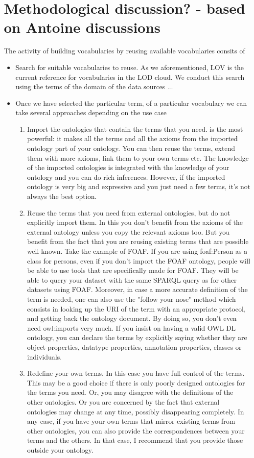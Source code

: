 \section{Methodological discussion? - based on Antoine discussions}
The activity of building vocabularies by reusing available vocabularies consits of
\begin{itemize}
	\item Search for suitable vocabularies to reuse. As we aforementioned, LOV is the current reference for vocabularies in the LOD cloud. We conduct this search using the terms of the domain of the data sources ... 
	\item Once we have selected the particular term, of a particular vocabulary we can take several approaches depending on the use case
	\begin{enumerate}
		\item Import the ontologies that contain the terms that you need. is the most powerful: it makes all the terms and all the axioms from the imported ontology part of your ontology. You can then reuse the terms, extend them with more axioms, link them to your own terms etc. The knowledge of the imported ontologies is integrated with the knowledge of your ontology and you can do rich inferences. However, if the imported ontology is very big and expressive and you just need a few terms, it's not always the best option.
		\item Reuse the terms that you need from external ontologies, but do not explicitly import them. In this you don't benefit from the axioms of the external ontology unless you copy the relevant axioms too. But you benefit from the fact that you are reusing existing terms that are possible well known. Take the example of FOAF. If you are using foaf:Person as a class for persons, even if you don't import the FOAF ontology, people will be able to use tools that are specifically made for FOAF. They will be able to query your dataset with the same SPARQL query as for other datasets using FOAF. Moreover, in case a more accurate definition of the term is needed, one can also use the "follow your nose" method which consists in looking up the URI of the term with an appropriate protocol, and getting back the ontology document. By doing so, you don't even need owl:imports very much. If you insist on having a valid OWL DL ontology, you can declare the terms by explicitly saying whether they are object properties, datatype properties, annotation properties, classes or individuals.
		\item Redefine your own terms. In this case you have full control of the terms. This may be a good choice if there is only poorly designed ontologies for the terms you need. Or, you may disagree with the definitions of the other ontologies. Or you are concerned by the fact that external ontologies may change at any time, possibly disappearing completely. In any case, if you have your own terms that mirror existing terms from other ontologies, you can also provide the correspondences between your terms and the others. In that case, I recommend that you provide those outside your ontology.		

\end{enumerate}
\end{itemize}

